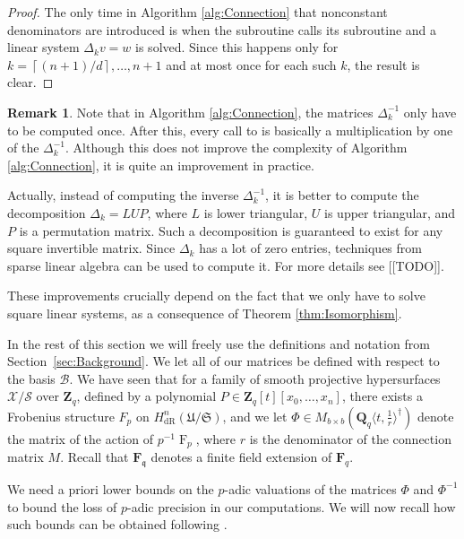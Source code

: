 \documentclass[a4paper,11pt]{article}
\numberwithin{equation}{section}
\providecommand{\ceil}[1]{\left\lceil#1\right\rceil}   %
\newcommand{\ZZ}{\mathbf{Z}} %
\newcommand{\QQ}{\mathbf{Q}} %
\newcommand{\FF}{\mathbf{F}} %
\DeclareMathOperator{\Frob}{F}           %
\providecommand{\HdR}{H_{\text{dR}}}    %
\providecommand{\cB}{\mathcal{B}} %
\theoremstyle{definition}
\newtheorem{rem}[thm]{Remark}
\begin{document}
\begin{proof}
The only time in Algorithm \ref{alg:Connection} that nonconstant denominators are introduced is when the subroutine {} 
calls its subroutine {} and a linear system $\Delta_k v = w$ is solved. Since this happens only for 
$k=\ceil{(n+1)/d}, \dotsc, n+1$ and at most once for each such $k$, the result is clear.
\end{proof}

\begin{rem} Note that in Algorithm \ref{alg:Connection}, the matrices $\Delta_k^{-1}$ only have to be computed
once. After this, every call to {} is basically a multiplication by one of the $\Delta_k^{-1}$.
Although this does not improve the complexity of Algorithm \ref{alg:Connection}, it is quite an improvement 
in practice. 

Actually, instead of computing the inverse $\Delta_k^{-1}$, it is better to compute the 
decomposition $\Delta_k = L U P$, where $L$ is lower triangular, $U$ is upper triangular, and
$P$ is a permutation matrix. Such a decomposition is guaranteed to exist for any square invertible
matrix. Since $\Delta_k$ has a lot of zero entries, techniques from sparse linear algebra can be 
used to compute it. For more details see [[TODO]].

These improvements crucially depend on the fact that we only have to solve square linear
systems, as a consequence of Theorem \ref{thm:Isomorphism}.
\end{rem}

In the rest of this section we will freely use the definitions and notation from Section~\ref{sec:Background}. 
We let all of our matrices be defined with respect to the basis $\cB$. We have seen that for a
family of smooth projective hypersurfaces $\mathcal{X}/\mathcal{S}$ over $\ZZ_q$, 
defined by a polynomial $P \in \ZZ_q[t][x_0,\ldots,x_n]$, there exists 
a Frobenius structure $F_p$ on $\HdR^n(\mathfrak{U}/\mathfrak{S})$, and we let 
$\Phi \in M_{b \times b}(\QQ_q \langle t, \frac{1}{r} \rangle^{\dag})$ denote the 
matrix of the action of $p^{-1}\Frob_p$, where $r$ is the denominator of the connection 
matrix $M$. Recall that $\FF_{\mathfrak{q}}$ denotes a finite field extension of $\FF_q$. 

We need a priori lower bounds on the $p$-adic valuations of the matrices $\Phi$ and 
$\Phi^{-1}$ to bound the loss of $p$-adic precision in our computations. We will now
recall how such bounds can be obtained following \cite{AbbottKedlayaRoe2006}.
\end{document}
